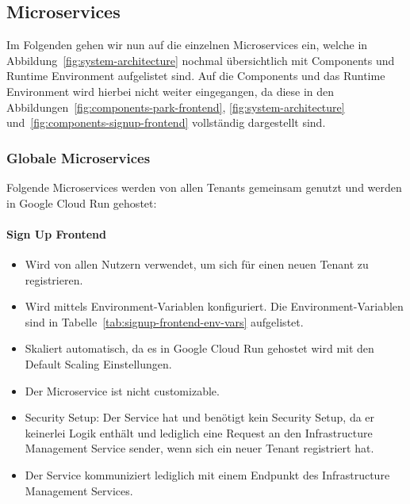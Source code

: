 \subsection{Microservices}
Im Folgenden gehen wir nun auf die einzelnen Microservices ein, welche in Abbildung~\ref{fig:system-architecture} nochmal übersichtlich mit Components und Runtime Environment aufgelistet sind.
Auf die Components und das Runtime Environment wird hierbei nicht weiter eingegangen, da diese in den Abbildungen~\ref{fig:components-park-frontend}, \ref{fig:system-architecture} und~\ref{fig:components-signup-frontend} vollständig dargestellt sind.

\subsubsection{Globale Microservices}
Folgende Microservices werden von allen Tenants gemeinsam genutzt und werden in Google Cloud Run gehostet:

\paragraph{Sign Up Frontend}
\begin{itemize}
	\item Wird von allen Nutzern verwendet, um sich für einen neuen Tenant zu registrieren.
	\item Wird mittels Environment-Variablen konfiguriert. Die Environment-Variablen sind in Tabelle~\ref{tab:signup-frontend-env-vars} aufgelistet.
	\item Skaliert automatisch, da es in Google Cloud Run gehostet wird mit den Default Scaling Einstellungen.
	\item Der Microservice ist nicht customizable.
	\item Security Setup: Der Service hat und benötigt kein Security Setup, da er keinerlei Logik enthält und lediglich eine Request an den Infrastructure Management Service sender, wenn sich ein neuer Tenant registriert hat.
	\item Der Service kommuniziert lediglich mit einem Endpunkt des Infrastructure Management Services.
\end{itemize}

